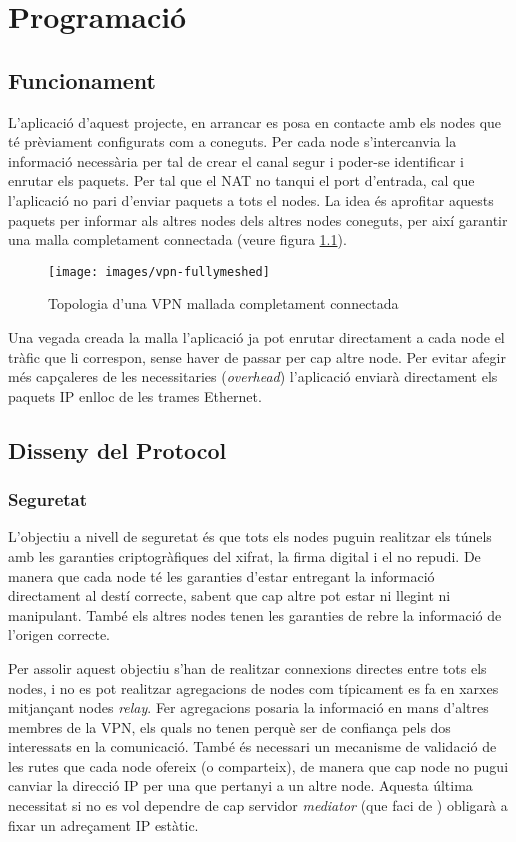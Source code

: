 \chapter{Programació}
\section{Funcionament}
L'aplicació d'aquest projecte, en arrancar es posa en contacte amb els nodes que té prèviament configurats com a coneguts. Per cada node s'intercanvia la informació necessària per tal de crear el canal segur i poder-se identificar i enrutar els paquets. Per tal que el NAT no tanqui el port d'entrada, cal que l'aplicació no pari d'enviar paquets a tots el nodes. La idea és aprofitar aquests paquets per informar als altres nodes dels altres nodes coneguts, per així garantir una malla completament connectada (veure figura \ref{F:vpn-fullymeshed}).
\begin{figure}[htb]
\centering
\texttt{[image: images/vpn-fullymeshed]}
\caption{Topologia d'una VPN mallada completament connectada}
\label{F:vpn-fullymeshed}
\end{figure}
Una vegada creada la malla l'aplicació ja pot enrutar directament a cada node el tràfic que li correspon, sense haver de passar per cap altre node. Per evitar afegir més capçaleres de les necessitaries (\emph{overhead}) l'aplicació enviarà directament els paquets IP enlloc de les trames Ethernet.

\section{Disseny del Protocol}
\subsection{Seguretat}
L'objectiu a nivell de seguretat és que tots els nodes puguin realitzar els túnels amb les garanties criptogràfiques del xifrat, la firma digital i el no repudi. De manera que cada node té les garanties d'estar entregant la informació directament al destí correcte, sabent que cap altre pot estar ni llegint ni manipulant. També els altres nodes tenen les garanties de rebre la informació de l'origen correcte.

Per assolir aquest objectiu s'han de realitzar connexions directes entre tots els nodes, i no es pot realitzar agregacions de nodes com típicament es fa en xarxes  mitjançant nodes \emph{relay}. Fer agregacions posaria la informació en mans d'altres membres de la VPN, els quals no tenen perquè ser de confiança pels dos interessats en la comunicació. També és necessari un mecanisme de validació de les rutes que cada node ofereix (o comparteix), de manera que cap node no pugui canviar la direcció IP per una que pertanyi a un altre node. Aquesta última necessitat si no es vol dependre de cap servidor \emph{mediator} (que faci de ) obligarà a fixar un adreçament IP estàtic.

